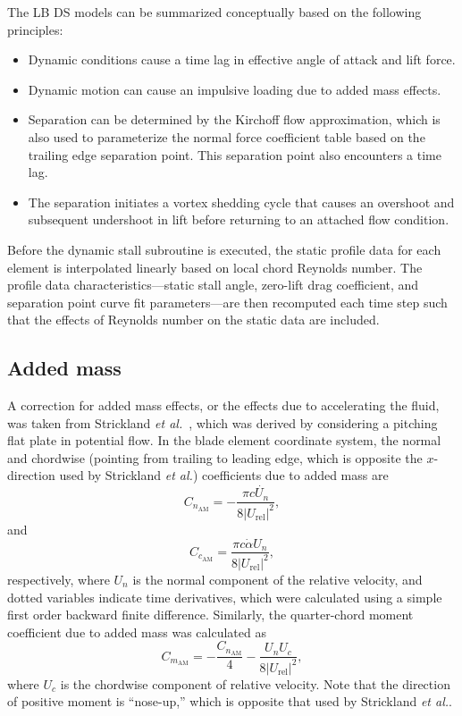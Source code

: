 The LB DS models can be summarized conceptually based on the following principles:
\begin{itemize}
    \item Dynamic conditions cause a time lag in effective angle of attack and
    lift force.
    
    \item Dynamic motion can cause an impulsive loading due to added mass
    effects.
    
    \item Separation can be determined by the Kirchoff flow approximation, which
    is also used to parameterize the normal force coefficient table based on the
    trailing edge separation point. This separation point also encounters a time
    lag.
    
    \item The separation initiates a vortex shedding cycle that causes an
    overshoot and subsequent undershoot in lift before returning to an attached
    flow condition.
\end{itemize}

Before the dynamic stall subroutine is executed, the static profile data for
each element is interpolated linearly based on local chord Reynolds number. The
profile data characteristics---static stall angle, zero-lift drag coefficient,
and separation point curve fit parameters---are then recomputed each time step
such that the effects of Reynolds number on the static data are included.


\subsection{Added mass}

A correction for added mass effects, or the effects due to accelerating the
fluid, was taken from Strickland \emph{et al.}~\cite{Strickland1981}, which was
derived by considering a pitching flat plate in potential flow. In the blade
element coordinate system, the normal and chordwise (pointing from trailing to
leading edge, which is opposite the $x$-direction used by Strickland \emph{et
    al.}) coefficients due to added mass are
\begin{equation}
    C_{n_\mathrm{AM}} = -\frac{\pi c \dot{U_n}}{8 | U_\mathrm{rel} |^2}, 
\end{equation}
and
\begin{equation}
    C_{c_\mathrm{AM}} = \frac{\pi c \dot{\alpha} U_n }{8 | U_\mathrm{rel} |^2}, 
\end{equation}
respectively, where $U_n$ is the normal component of the relative velocity, and
dotted variables indicate time derivatives, which were calculated using a simple
first order backward finite difference. Similarly, the quarter-chord moment
coefficient due to added mass was calculated as
\begin{equation}
    C_{m_\mathrm{AM}} = -\frac{C_{n_\mathrm{AM}}}{4} 
        - \frac{U_n U_c}{8 | U_\mathrm{rel} |^2},
\end{equation}
where $U_c$ is the chordwise component of relative velocity. Note that the
direction of positive moment is ``nose-up,'' which is opposite that used by
Strickland \emph{et al.}.

